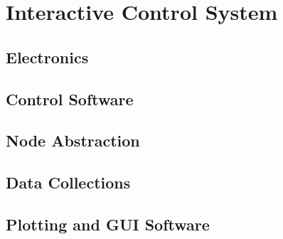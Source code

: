 \chapter{Interactive Control System}

\section{Electronics}


\section{Control Software}

\section{Node Abstraction}

\section{Data Collections}

\section{Plotting and GUI Software}
